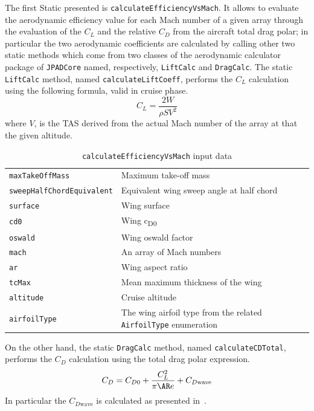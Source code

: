 \bigskip
\noindent
The first \gls{Static} presented is \lstinline[language=Java]!calculateEfficiencyVsMach!. It allows to evaluate the aerodynamic efficiency value for each  Mach number of a given array through the evaluation of the $C_{L}$ and the relative $C_{D}$ from the aircraft total drag polar; in particular the two aerodynamic coefficients are calculated by calling other two static methods which come from two classes of the aerodynamic calculator package of \lstinline[language=Java]!JPADCore! named, respectively, \lstinline[language=Java]!LiftCalc! and \lstinline[language=Java]!DragCalc!.
%
The static \lstinline[language=Java]!LiftCalc! method, named \lstinline[language=Java]!calculateLiftCoeff!, performs the $C_{L}$ calculation using the following formula, valid in cruise phase.
%
\begin{equation}
C_L=\frac{2W}{\rho S V^2}
\label{eqn:Lift.Equation}
\end{equation}
%
\noindent
where $V$, is the \gls{TAS} derived from the actual Mach number of the array at that the given altitude.
%
\begin{table}[b]
\begin{tabular}{p{7cm}p{7.5cm}}
\toprule
\lstinline[language=Java]!maxTakeOffMass! & Maximum take-off mass \\[0.1	cm]
\lstinline[language=Java]!sweepHalfChordEquivalent! & Equivalent wing sweep angle at half chord \\[0.1cm]
\lstinline[language=Java]!surface! & Wing surface \\[0.1cm]
\lstinline[language=Java]!cd0!	& Wing c\textsubscript{D0} \\[0.1cm]
\lstinline[language=Java]!oswald!	& Wing oswald factor \\[0.1cm]
\lstinline[language=Java]!mach!	& An array of Mach numbers \\[0.1cm]
\lstinline[language=Java]!ar!	& Wing aspect ratio \\[0.1cm]
\lstinline[language=Java]!tcMax! & Mean maximum thickness of the wing \\[0.1cm]
\lstinline[language=Java]!altitude! & Cruise altitude \\[0.1cm]
\lstinline[language=Java]!airfoilType! & The wing airfoil type from the related \lstinline[language=Java]!AirfoilType! enumeration \\
\bottomrule
\end{tabular}
\caption{ \lstinline[language=Java]!calculateEfficiencyVsMach! input data}
\label{table:Table1}
\end{table}
%
On the other hand, the static \lstinline[language=Java]!DragCalc! method, named \lstinline[language=Java]!calculateCDTotal!, performs the $C_{D}$ calculation using the total drag polar expression.
%
\begin{equation}
C_D=C_{D0}+\frac{C_L^2}{\pi \ensuremath{\AR} e}+C_{D\text{wave}}
\label{eqn:Drag.Total}
\end{equation}
%
\noindent
In particular the $C_{D\text{wave}}$ is calculated as presented in~\cite{hilton1951high}.

